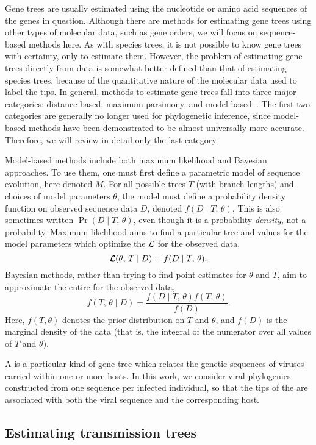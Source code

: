 Gene trees are usually estimated using the nucleotide or amino acid sequences
of the genes in question. Although there are methods for estimating gene trees
using other types of molecular data, such as gene orders, we will focus on
sequence-based methods here. As with species trees, it is not possible to know
gene trees with certainty, only to estimate them. However, the problem of
estimating gene trees directly from data is somewhat better defined than that
of estimating species trees, because of the quantitative nature of the
molecular data used to label the tips. In general, methods to estimate gene
trees fall into three major categories: distance-based, maximum parsimony, and
model-based~\autocite{nei2000molecular}. The first two categories are generally
no longer used for phylogenetic inference, since model-based methods have been
demonstrated to be almost universally more accurate. Therefore, we will review
in detail only the last category.

Model-based methods include both maximum likelihood and Bayesian approaches. To
use them, one must first define a parametric model of sequence evolution, here
denoted $M$. For all possible trees $T$ (with branch lengths) and choices of
model parameters $\theta$, the model must define a probability density function
on observed sequence data $D$, denoted $f(D \mid T,\,\theta)$. This is also
sometimes written $\Pr(D \mid T,\,\theta)$, even though it is a probability
\emph{density}, not a probability. Maximum likelihood aims to find a particular
tree and values for the model parameters which optimize the  $\mathcal{L}$ for the observed data,
\[
  \mathcal{L}(\theta,\, T \mid D) = f(D \mid T,\, \theta).
\]
Bayesian methods, rather than trying to find point estimates for $\theta$ and
$T$, aim to approximate the entire  for the
observed data,
\[
  f(T,\,\theta \mid D) = \frac{f(D \mid T,\,\theta)f(T,\,\theta)}{f(D)}.
\]
Here, $f(T, \theta)$ denotes the prior distribution on $T$ and $\theta$, and
$f(D)$ is the marginal density of the data (that is, the integral of the
numerator over all values of $T$ and $\theta$).

A  is a particular kind of gene tree which relates the
genetic sequences of viruses carried within one or more hosts. In this work, we
consider viral phylogenies constructed from one sequence per infected
individual, so that the tips of the are associated with both the viral sequence
and the corresponding host.

\subsection{Estimating transmission trees}
\label{subsubsec:treeconv}


